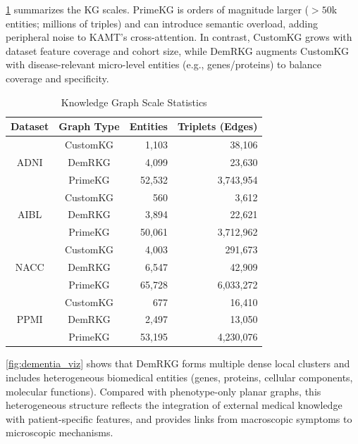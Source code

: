 \documentclass[lettersize,journal]{IEEEtran}
\begin{document}
    \cref{tab:kg_statistics} summarizes the KG scales. PrimeKG is orders of magnitude larger ($>50$k entities; millions of triples) and can introduce semantic overload, adding peripheral noise to KAMT's cross-attention. In contrast, CustomKG grows with dataset feature coverage and cohort size, while DemRKG augments CustomKG with disease-relevant micro-level entities (e.g., genes/proteins) to balance coverage and specificity.
    \begin{table}[!t]
    \centering
    \caption{Knowledge Graph Scale Statistics}
    \label{tab:kg_statistics}
    \setlength{\tabcolsep}{8pt}
    \renewcommand{\arraystretch}{1.15}
    \begin{tabular}{c c r r}
    \hline
    \textbf{Dataset} & \textbf{Graph Type} & \textbf{Entities} & \textbf{Triplets (Edges)} \\
    \hline
    \multirow{3}{*}{ADNI} & CustomKG & 1,103  & 38,106 \\
                        & DemRKG   & 4,099  & 23,630 \\
                        & PrimeKG  & 52,532 & 3,743,954 \\
    \hline
    \multirow{3}{*}{AIBL} & CustomKG & 560    & 3,612 \\
                        & DemRKG   & 3,894  & 22,621 \\
                        & PrimeKG  & 50,061 & 3,712,962 \\
    \hline
    \multirow{3}{*}{NACC} & CustomKG & 4,003  & 291,673 \\
                        & DemRKG   & 6,547  & 42,909 \\
                        & PrimeKG  & 65,728 & 6,033,272 \\
    \hline
    \multirow{3}{*}{PPMI} & CustomKG & 677    & 16,410 \\
                        & DemRKG   & 2,497  & 13,050 \\
                        & PrimeKG  & 53,195 & 4,230,076 \\
    \hline
    \end{tabular}
    \end{table}

    
    \cref{fig:dementia_viz} shows that DemRKG forms multiple dense local clusters and includes heterogeneous biomedical entities (genes, proteins, cellular components, molecular functions). Compared with phenotype-only planar graphs, this heterogeneous structure reflects the integration of external medical knowledge with patient-specific features, and provides links from macroscopic symptoms to microscopic mechanisms.
\end{document}
